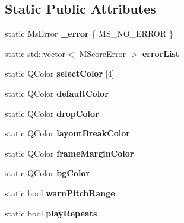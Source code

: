 \subsection*{Static Public Attributes}
\begin{DoxyCompactItemize}
\item 
\mbox{\label{class_ms_1_1_m_score_a7490ecd88338d8ff3ffc39f5545171a4}} 
static Ms\+Error {\bfseries \+\_\+error} \{ M\+S\+\_\+\+N\+O\+\_\+\+E\+R\+R\+OR \}
\item 
static std\+::vector$<$ \hyperlink{struct_ms_1_1_m_score_error}{M\+Score\+Error} $>$ {\bfseries error\+List}
\item 
\mbox{\label{class_ms_1_1_m_score_ada12b1842b5cd6861e6619c6b61f6464}} 
static Q\+Color {\bfseries select\+Color} \mbox{[}4\mbox{]}
\item 
\mbox{\label{class_ms_1_1_m_score_a6a9e251087207c0dffe19f77b9e8c9aa}} 
static Q\+Color {\bfseries default\+Color}
\item 
\mbox{\label{class_ms_1_1_m_score_a36af57bea24f717d3517a9d7e5d00e85}} 
static Q\+Color {\bfseries drop\+Color}
\item 
\mbox{\label{class_ms_1_1_m_score_ad44cac08537f134bbb16b5a49a190ed9}} 
static Q\+Color {\bfseries layout\+Break\+Color}
\item 
\mbox{\label{class_ms_1_1_m_score_ab56667808f0d632f2f7d6bfd1093e1f0}} 
static Q\+Color {\bfseries frame\+Margin\+Color}
\item 
\mbox{\label{class_ms_1_1_m_score_a25a281f50abe7cb55e81182c66c50d56}} 
static Q\+Color {\bfseries bg\+Color}
\item 
\mbox{\label{class_ms_1_1_m_score_a18bcfe839ebcfbf64075ee2c7cf19b07}} 
static bool {\bfseries warn\+Pitch\+Range}
\item 
\mbox{\label{class_ms_1_1_m_score_acd59214092212bd9e516b1fc7dcef127}} 
static bool {\bfseries play\+Repeats}
\item 
\mbox{\label{class_ms_1_1_m_score_a91c676bfa105043631b0995190c0449d}} 

\end{DoxyCompactItemize}
